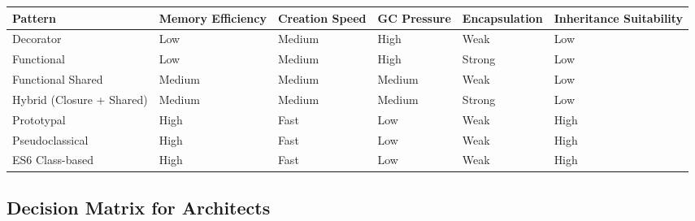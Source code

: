 \documentclass{scrbook}
\begin{document}
\begin{table}[h]
    \centering
    \tiny
    \begin{tabularx}{\linewidth}{|X|X|X|X|X|X|}
        \hline
        \textbf{Pattern} & \textbf{Memory Efficiency} & \textbf{Creation Speed} & \textbf{GC Pressure} & \textbf{Encapsulation} & \textbf{Inheritance Suitability} \\
        \hline
        
        Decorator      & Low  & Medium & High & Weak   & Low \\
        \hline
        
        Functional     & Low  & Medium & High & Strong & Low \\
        \hline
        
        Functional Shared & Medium & Medium & Medium & Weak & Low \\
        \hline
        
        Hybrid (Closure + Shared) & Medium & Medium & Medium & Strong & Low \\
        \hline
        
        Prototypal     & High & Fast   & Low  & Weak   & High \\
        \hline
        
        Pseudoclassical & High & Fast  & Low  & Weak   & High \\
        \hline
        
        ES6 Class-based & High & Fast  & Low  & Weak   & High \\
        \hline
    \end{tabularx}
\end{table}

\subsection{Decision Matrix for Architects}
\end{document}
